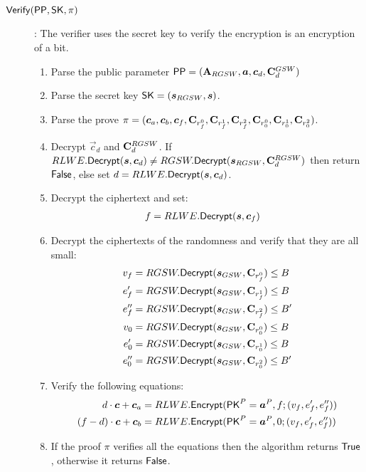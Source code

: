 \begin{description}
\item[${\mathsf{Verify}}({\mathsf{PP}}, \mathsf{SK}, \pi)$]: The verifier uses the secret key to verify the encryption is an encryption of a bit.
  \begin{enumerate}
  \item Parse the public parameter $\PPP = (\mat{A}_{RGSW}, \vec{a}, \vec{c}_d, \mat{C}_d^{GSW})$
  \item Parse the secret key $\SK = (\vec{s}_{RGSW}, \vec{s})$.
  \item Parse the prove $\pi = (\vec{c}_a, \vec{c}_b, \vec{c}_f, \mat{C}_{r_f^0}, \mat{C}_{r_f^1}, \mat{C}_{r_f^2}, \mat{C}_{r_0^0}, \mat{C}_{r_0^1}, \mat{C}_{r_0^2})$.
  \item Decrypt $\vec{c}_d$ and $\mathbf{C}_d^{RGSW}$.
    If $RLWE.\Dec(\vec{s}, \vec{c}_d) \neq RGSW.\Dec(\vec{s}_{RGSW}, \mat{C}_d^{RGSW})$ then return $\mathsf{False}$, else set $d = RLWE.\Dec(\vec{s}, \vec{c}_d)$.
  \item Decrypt the ciphertext and set:
    \begin{align*}
      f &= RLWE.\Dec(\vec{s}, \vec{c}_f)
    \end{align*}
  \item Decrypt the ciphertexts of the randomness and verify that they are all small:
    \begin{align*}
      v_f & = RGSW.\Dec(\vec{s}_{GSW}, \mat{C}_{r_f^0}) \leq B \\
      e_f' & = RGSW.\Dec(\vec{s}_{GSW}, \mat{C}_{r_f^1}) \leq B \\
      e_f'' & = RGSW.\Dec(\vec{s}_{GSW}, \mat{C}_{r_f^2}) \leq B' \\
      v_0 & = RGSW.\Dec(\vec{s}_{GSW}, \mat{C}_{r_0^0}) \leq B \\
      e_0' & = RGSW.\Dec(\vec{s}_{GSW}, \mat{C}_{r_0^1}) \leq B \\
      e_0'' & = RGSW.\Dec(\vec{s}_{GSW}, \mat{C}_{r_0^2}) \leq B' \\
    \end{align*}
  \item Verify the following equations:
    \begin{align*}
      d \cdot \vec{c} + \vec{c}_a &= RLWE.\Enc(\PK^P = \vec{a}^P, f; (v_f, e_f', e_f''))\\
      (f-d) \cdot \vec{c} + \vec{c}_b &= RLWE.\Enc(\PK^P= \vec{a}^P, 0; (v_f, e_f', e_f''))
    \end{align*}
  \item If the proof $\pi$ verifies all the equations then the algorithm returns $\mathsf{True}$, otherwise it returns $\mathsf{False}$.
  \end{enumerate}
  
  
  
\end{description}
